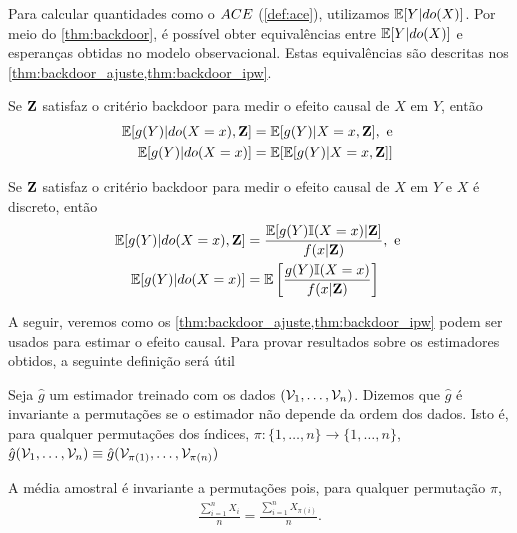 Para calcular quantidades 
como o ${ACE}$ (\cref{def:ace}), 
utilizamos ${\mathbb E}[Y|do(X)]$.
Por meio do \cref{thm:backdoor},
é possível obter equivalências entre
${\mathbb E}[Y|do(X)]$ e esperanças obtidas
no modelo observacional.
Estas equivalências são descritas
nos \cref{thm:backdoor_ajuste,thm:backdoor_ipw}.

\begin{theorem}
 \label{thm:backdoor_ajuste}
 Se ${\mathbf{Z}}$ satisfaz 
 o critério backdoor para medir
 o efeito causal de $X$ em $Y$, então
 \begin{align*}
  {\mathbb E}[g(Y)|do(X=x),{\mathbf{Z}}]
  &= {\mathbb E}[g(Y)|X=x,{\mathbf{Z}}], \text{ e } \\
  {\mathbb E}[g(Y)|do(X=x)] 
  &= {\mathbb E}[{\mathbb E}[g(Y)|X=x,{\mathbf{Z}}]]
 \end{align*}
\end{theorem}

\begin{theorem}
 \label{thm:backdoor_ipw}
 Se ${\mathbf{Z}}$ satisfaz 
 o critério backdoor para medir
 o efeito causal de $X$ em $Y$ e
 $X$ é discreto, então
 \begin{align*}
  {\mathbb E}[g(Y)|do(X=x),{\mathbf{Z}}] 
  &= \frac{{\mathbb E}[g(Y){\mathbb I}(X=x)|{\mathbf{Z}}]}{f(x|{\mathbf{Z}})}, \text{ e } \\
  {\mathbb E}[g(Y)|do(X=x)]
  &= {\mathbb E}\left[\frac{g(Y){\mathbb I}(X=x)}{f(x|{\mathbf{Z}})}\right]
 \end{align*}
\end{theorem}

A seguir, veremos como os
\cref{thm:backdoor_ajuste,thm:backdoor_ipw} podem
ser usados para estimar o efeito causal.
Para provar resultados sobre os estimadores obtidos,
a seguinte definição será útil

\begin{definition}
 \label{def:perm}
 Seja $\hat{g}$ um estimador treinado com
 os dados $({\mathcal V}_1,\ldots,{\mathcal V}_n)$.
 Dizemos que $\hat{g}$ é 
 invariante a permutações se
 o estimador não depende da ordem dos dados.
 Isto é, para qualquer permutações dos índices,
 $\pi: \{1,\ldots,n\} \rightarrow \{1,\ldots,n\}$,
 $\hat{g}({\mathcal V}_1,\ldots,{\mathcal V}_n) \equiv 
 \hat{g}({\mathcal V}_{\pi(1)},\ldots,{\mathcal V}_{\pi(n)})$
\end{definition}

\begin{example}
 \label{ex:perm}
 A média amostral é invariante a permutações pois,
 para qualquer permutação $\pi$,
 \begin{align*}
  \frac{\sum_{i=1}^n X_i}{n} 
  = \frac{\sum_{i=1}^n X_{\pi(i)}}{n}.
 \end{align*} 
\end{example}

